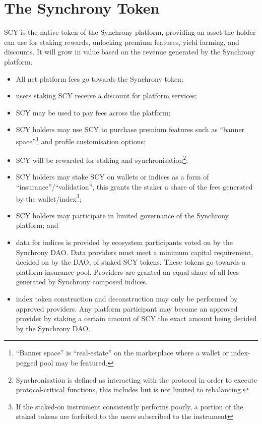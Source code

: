 \documentclass[10pt]{article}
\begin{document}
					\section{The Synchrony Token}
					SCY is the native token of the Synchrony platform, providing an asset the holder
					can use for staking rewards, unlocking premium features, yield farming, and
					discounts. It will grow in value based on the revenue generated by the Synchrony
					platform.
					\begin{itemize}
						\item All net platform fees go towards the Synchrony token;
						\item users staking SCY receive a discount for platform services;
						\item SCY may be used to pay fees across the platform;
						\item SCY holders may use SCY to purchase premium features such as ``banner
							space''\footnote[8]{``Banner space'' is ``real-estate'' on the
							marketplace where a wallet or index-pegged pool may be featured.} and
							profile customisation options;
						\item SCY will be rewarded for staking and
							synchronisation\footnote[9]{Synchronisation is defined as interacting
							with the protocol in order to execute protocol-critical functions, this
							includes but is not limited to rebalancing.};
						\item SCY holders may stake SCY on wallets or indices as a form of
							``insurance''/``validation'', this grants the staker a share of the fees
							generated by the wallet/index\footnote[10]{If the staked-on instrument
							consistently performs poorly, a portion of the staked tokens are
							forfeited to the users subscribed to the instrument};
						\item SCY holders may participate in limited governance of the Synchrony
							platform; and
						\item data for indices is provided by ecosystem participants voted on by the
							Synchrony DAO. Data providers must meet a minimum capital requirement,
							decided on by the DAO, of staked SCY tokens. These tokens go towards
							a platform insurance pool. Providers are granted an equal share of all
							fees generated by Synchrony composed indices.
						\item index token construction and deconstruction may only be performed by
							approved providers. Any platform participant may become an approved provider by
							staking a certain amount of SCY the exact amount being decided by the
							Synchrony DAO.
					\end{itemize}
\end{document}
